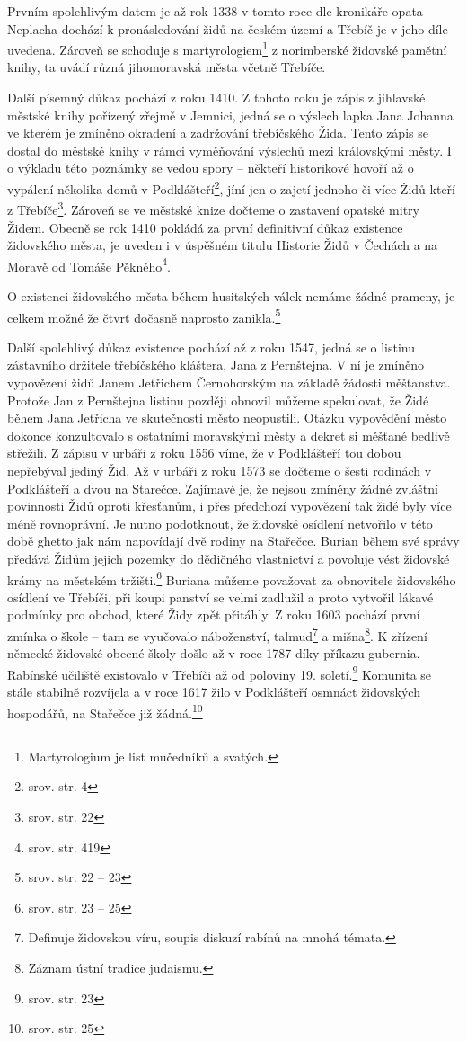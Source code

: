 \documentclass[a4paper,oneside,12pt]{report}
\begin{document}
Prvním spolehlivým datem je až rok 1338 v tomto roce dle kronikáře opata Neplacha dochází k pronásledování židů na českém území a Třebíč je v jeho díle uvedena.
Zároveň se schoduje s martyrologiem\footnote{Martyrologium je list mučedníků a svatých.} z norimberské židovské pamětní knihy, ta uvádí různá jihomoravská města včetně Třebíče.

Další písemný důkaz pochází z roku 1410.
Z tohoto roku je zápis z jihlavské městské knihy pořízený zřejmě v Jemnici, jedná se o výslech lapka Jana Johanna ve kterém je zmíněno okradení a zadržování třebíčského Žida.
Tento zápis se dostal do městské knihy v rámci vyměňování výslechů mezi královskými městy.
I o výkladu této poznámky se vedou spory -- někteří historikové hovoří až o vypálení několika domů v Podklášteří\footnote{srov.  str. 4}, jíní jen o zajetí jednoho či více Židů kteří z Třebíče\footnote{srov. \cite{Fiser2005} str. 22}.
Zároveň se ve městské knize dočteme o zastavení opatské mitry Židem.
Obecně se rok 1410 pokládá za první definitivní důkaz existence židovského města, je uveden i v úspěšném titulu Historie Židů v Čechách a na Moravě od Tomáše Pěkného\footnote{srov.  str. 419}.

O existenci židovského města během husitských válek nemáme žádné prameny, je celkem možné že čtvrť dočasně naprosto zanikla.\footnote{srov. \cite{Fiser2005} str. 22 -- 23}

Další spolehlivý důkaz existence pochází až z roku 1547, jedná se o listinu zástavního držitele třebíčského kláštera, Jana z Pernštejna.
V ní je zmíněno vypovězení židů Janem Jetřichem Černohorským na základě žádosti měšťanstva.
Protože Jan z Pernštejna listinu později obnovil můžeme spekulovat, že Židé během Jana Jetřicha ve skutečnosti město neopustili.
Otázku vypovědění město dokonce konzultovalo s ostatními moravskými městy a dekret si měšťané bedlivě střežili.
Z zápisu v urbáři z roku 1556 víme, že v Podklášteří tou dobou nepřebýval jediný Žid.
Až v urbáři z roku 1573 se dočteme o šesti rodinách v Podklášteří a dvou na Starečce.
Zajímavé je, že nejsou zmíněny žádné zvláštní povinnosti Židů oproti křesťanům, i přes předchozí vypovězení tak židé byly více méně rovnoprávní.
Je nutno podotknout, že židovské osídlení netvořilo v této době ghetto jak nám napovídají dvě rodiny na Stařečce.
Burian během své správy předává Židům jejich pozemky do dědičného vlastnictví a povoluje vést židovské krámy na městském tržišti.\footnote{srov. \cite{Fiser2005} str. 23 -- 25}
Buriana můžeme považovat za obnovitele židovského osídlení ve Třebíči, při koupi panství se velmi zadlužil a proto vytvořil lákavé podmínky pro obchod, které Židy zpět přitáhly.
Z roku 1603 pochází první zmínka o škole -- tam se vyučovalo náboženství, talmud\footnote{Definuje židovskou víru, soupis diskuzí rabínů na mnohá témata.} a mišna\footnote{Záznam ústní tradice judaismu.}.
K zřízení německé židovské obecné školy došlo až v roce 1787 díky příkazu gubernia.
Rabínské učiliště existovalo v Třebíči až od poloviny 19. soletí.\footnote{srov. \cite{Klenovsky2003} str. 23}
Komunita se stále stabilně rozvíjela a v roce 1617 žilo v Podklášteří osmnáct židovských hospodářů, na Stařečce již žádná.\footnote{srov. \cite{Fiser2005} str. 25}
\end{document}
